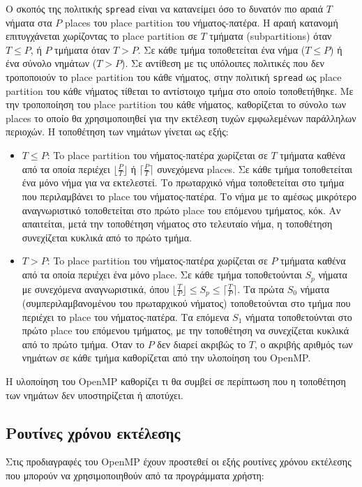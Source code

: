 Ο σκοπός της πολιτικής \texttt{spread} είναι να κατανείμει όσο το δυνατόν πιο αραιά $T$ νήματα στα $P$ places του place partition του νήματος-πατέρα. Η αραιή κατανομή επιτυγχάνεται χωρίζοντας το place partition σε $T$ τμήματα (subpartitions) όταν $T \leq P$, ή $P$ τμήματα όταν $T > P$. Σε κάθε τμήμα τοποθετείται ένα νήμα ($T \leq P$) ή ένα σύνολο νημάτων ($T > P$). Σε αντίθεση με τις υπόλοιπες πολιτικές που δεν τροποποιούν το place partition του κάθε νήματος, στην πολιτική \texttt{spread} ως place partition του κάθε νήματος τίθεται το αντίστοιχο τμήμα στο οποίο τοποθετήθηκε. Με την τροποποίηση του place partition του κάθε νήματος, καθορίζεται το σύνολο των places το οποίο θα χρησιμοποιηθεί για την εκτέλεση τυχών εμφωλεμένων παράλληλων περιοχών. Η τοποθέτηση των νημάτων γίνεται ως εξής:
\begin{itemize}
	\item $T \leq P$: To place partition του νήματος-πατέρα χωρίζεται σε $T$ τμήματα καθένα από τα οποία περιέχει $\lfloor \frac{P}{T} \rfloor$ ή $\lceil \frac{P}{T} \rceil$ συνεχόμενα places. Σε κάθε τμήμα τοποθετείται ένα μόνο νήμα για να εκτελεστεί. Το πρωταρχικό νήμα τοποθετείται στο τμήμα που περιλαμβάνει το place του νήματος-πατέρα. Το νήμα με το αμέσως μικρότερο αναγνωριστικό τοποθετείται στο πρώτο place του επόμενου τμήματος, κόκ. Αν απαιτείται, μετά την τοποθέτηση νήματος στο τελευταίο νήμα, η τοποθέτηση συνεχίζεται κυκλικά από το πρώτο τμήμα.
	\item $T > P$: To place partition του νήματος-πατέρα χωρίζεται σε $P$ τμήματα καθένα από τα οποία περιέχει ένα μόνο place. Σε κάθε τμήμα τοποθετούνται $S_p$ νήματα με συνεχόμενα αναγνωριστικά, όπου $\lfloor \frac{T}{P} \rfloor \leq S_p \leq \lceil \frac{T}{P} \rceil$. Τα πρώτα $S_0$ νήματα (συμπεριλαμβανομένου του πρωταρχικού νήματος) τοποθετούνται στο τμήμα που περιέχει το place του νήματος-πατέρα. Τα επόμενα $S_1$ νήματα τοποθετούνται στο πρώτο place του επόμενου τμήματος, με την τοποθέτηση να συνεχίζεται κυκλικά από το πρώτο τμήμα. Όταν το $P$ δεν διαρεί ακριβώς το $T$, ο ακριβής αριθμός των νημάτων σε κάθε τμήμα καθορίζεται από την υλοποίηση του OpenMP.
\end{itemize}

Η υλοποίηση του OpenMP καθορίζει τι θα συμβεί σε περίπτωση που η τοποθέτηση των νημάτων δεν υποστηρίζεται ή αποτύχει.

\subsection{Ρουτίνες χρόνου εκτέλεσης}
Στις προδιαγραφές του OpenMP έχουν προστεθεί οι εξής ρουτίνες χρόνου εκτέλεσης που μπορούν να χρησιμοποιηθούν από τα προγράμματα χρήστη:

